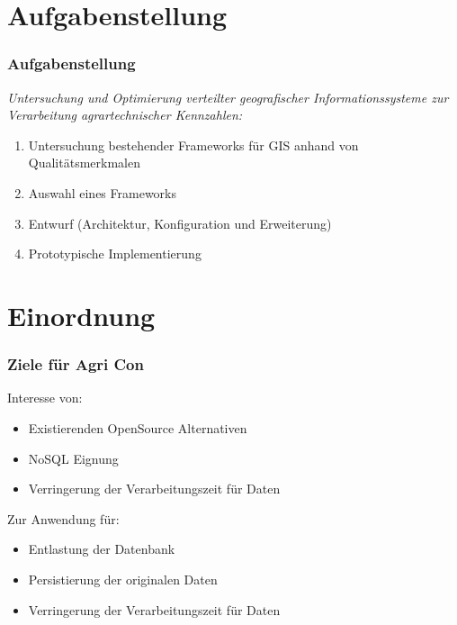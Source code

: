 \documentclass{beamer}
\begin{document}
\section{Aufgabenstellung}
\begin{frame}\frametitle{Aufgabenstellung}
\textit{Untersuchung und Optimierung verteilter geografischer Informationssysteme zur Verarbeitung agrartechnischer Kennzahlen:}\\


\begin{enumerate} %
\item Untersuchung bestehender Frameworks für GIS anhand von Qualitätsmerkmalen
\item Auswahl eines Frameworks
\item Entwurf (Architektur, Konfiguration und Erweiterung)
\item Prototypische Implementierung %
\end{enumerate}
\end{frame}

\section{Einordnung}
\begin{frame}\frametitle{Ziele für Agri Con} 
\begin{block}{Interesse von:}
\begin{itemize}
\item Existierenden OpenSource Alternativen
\item NoSQL Eignung
\item Verringerung der Verarbeitungszeit für Daten
\end{itemize}
\end{block}

\begin{block}{Zur Anwendung für:}
\begin{itemize}
\item Entlastung der Datenbank
\item Persistierung der originalen Daten
\item Verringerung der Verarbeitungszeit für Daten
\end{itemize}
\end{block}
\end{frame}
\end{document}
